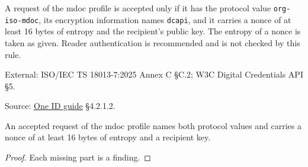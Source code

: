 \begin{definition}
  \label{def:mdoc-request}
  A request of the mdoc profile is accepted only if it has the protocol value
  \texttt{org-iso-mdoc}, its encryption information names \texttt{dcapi}, and it
  carries a nonce of at least 16 bytes of entropy and the recipient's public
  key.  The entropy of a nonce is taken as given.  Reader authentication is
  recommended and is not checked by this rule.

  External: ISO/IEC TS 18013-7:2025 Annex C §C.2; W3C Digital Credentials API
  §5.

  Source: \href{https://standards.atlassian.net/wiki/spaces/OneID/pages/2947416082/Technical+Implementation+Guide}{One ID guide} §4.2.1.2.
\end{definition}

\begin{theorem}
  \label{thm:mdoc-request-parts}
  An accepted request of the mdoc profile names both protocol values and
  carries a nonce of at least 16 bytes of entropy and a recipient key.
\end{theorem}
\begin{proof}
  Each missing part is a finding.
\end{proof}
